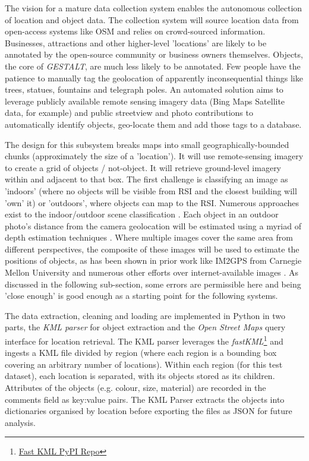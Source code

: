 The vision for a mature data collection system enables the autonomous collection of location and object data. 
The collection system will source location data from open-access systems like OSM and relies on crowd-sourced information. 
Businesses, attractions and other higher-level 'locations' are likely to be annotated by the open-source community or business owners themselves. 
Objects, the core of \textit{GESTALT}, are much less likely to be annotated. Few people have the patience to manually tag the geolocation of apparently inconsequential things like trees, statues, fountains and telegraph poles. 
An automated solution aims to leverage publicly available remote sensing imagery data (Bing Maps Satellite data, for example) and public streetview and photo contributions to automatically identify objects, geo-locate them and add those tags to a database. 

The design for this subsystem breaks maps into small geographically-bounded chunks (approximately the size of a 'location'). 
It will use remote-sensing imagery to create a grid of objects / not-object. It will retrieve ground-level imagery within and adjacent to that box.
The first challenge is classifying an image as 'indoors' (where no objects will be visible from RSI and the closest building will 'own' it) or 'outdoors', where objects can map to the RSI. Numerous approaches exist to the indoor/outdoor scene classification \cite{Tong2017}. 
Each object in an outdoor photo's distance from the camera geolocation will be estimated using a myriad of depth estimation techniques \cite{Ming2021,Liu2020}. 
Where multiple images cover the same area from different perspectives, the composite of these images will be used to estimate the positions of objects, as has been shown in prior work like IM2GPS from Carnegie Mellon University \cite{Hays2008} and numerous other efforts over internet-available images \cite{Snavely2011}. 
As discussed in the following sub-section, some errors are permissible here and being 'close enough' is good enough as a starting point for the following systems. 





The data extraction, cleaning and loading are implemented in Python in two parts, the \textit{KML parser} for object extraction and the \textit{Open Street Maps} query interface for location retrieval. 
The KML parser leverages the \textit{fastKML}\footnote{\href{https://pypi.org/project/fastkml/}{Fast KML PyPI Repo}} and ingests a KML file divided by region (where each region is a bounding box covering an arbitrary number of locations). 
Within each region (for this test dataset), each location is separated, with its objects stored as its children. 
Attributes of the objects (e.g. colour, size, material) are recorded in the comments field as key:value pairs.
The KML Parser extracts the objects into dictionaries organised by location before exporting the files as JSON for future analysis. 

